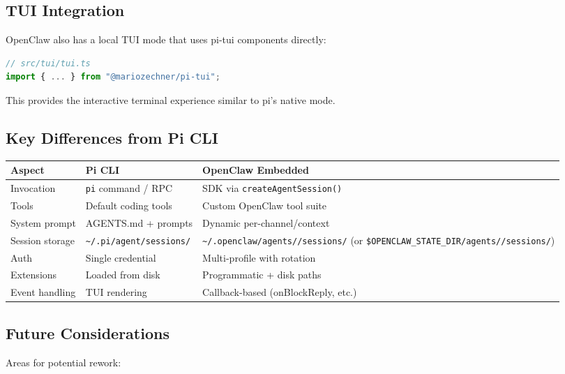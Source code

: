 \subsection{TUI Integration}


OpenClaw also has a local TUI mode that uses pi-tui components directly:

\begin{lstlisting}[language=typescript]
// src/tui/tui.ts
import { ... } from "@mariozechner/pi-tui";
\end{lstlisting}


This provides the interactive terminal experience similar to pi's native mode.

\subsection{Key Differences from Pi CLI}



\begin{table}[h]
\centering
\small
\begin{tabular}{|l|l|l|}
\hline
Aspect & Pi CLI & OpenClaw Embedded \\
\hline
Invocation & \texttt{pi} command / RPC & SDK via \texttt{createAgentSession()} \\
\hline
Tools & Default coding tools & Custom OpenClaw tool suite \\
\hline
System prompt & AGENTS.md + prompts & Dynamic per-channel/context \\
\hline
Session storage & \texttt{\textasciitilde{}/.pi/agent/sessions/} & \texttt{\textasciitilde{}/.openclaw/agents//sessions/} (or \texttt{\$OPENCLAW\_STATE\_DIR/agents//sessions/}) \\
\hline
Auth & Single credential & Multi-profile with rotation \\
\hline
Extensions & Loaded from disk & Programmatic + disk paths \\
\hline
Event handling & TUI rendering & Callback-based (onBlockReply, etc.) \\
\hline
\end{tabular}
\end{table}



\subsection{Future Considerations}


Areas for potential rework:

